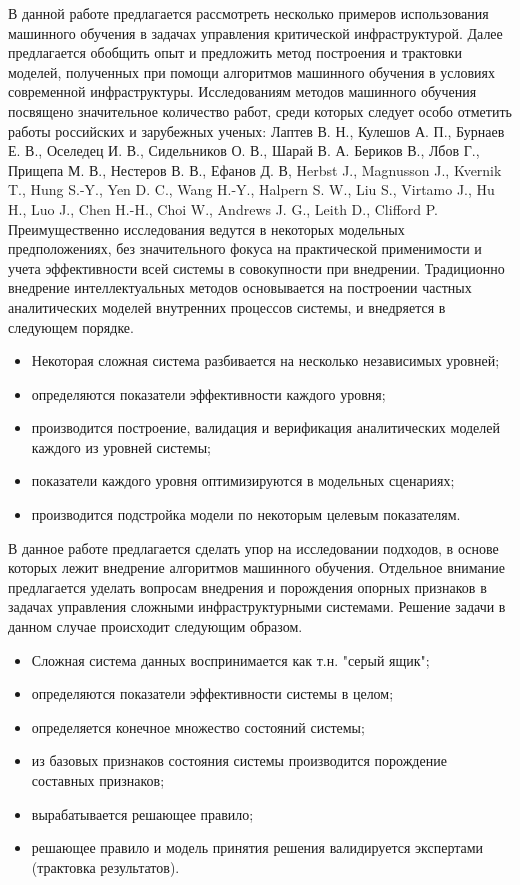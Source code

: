 
{\actuality}
В данной работе предлагается рассмотреть несколько примеров использования машинного обучения в задачах управления критической инфраструктурой. Далее предлагается обобщить опыт и предложить метод построения и трактовки моделей, полученных при помощи алгоритмов машинного обучения в условиях современной инфраструктуры.
Исследованиям методов машинного обучения посвящено значительное количество работ, среди которых следует особо отметить работы российских и зарубежных ученых: Лаптев В. Н., Кулешов А. П., Бурнаев Е. В., Оселедец И. В., Сидельников О. В., Шарай В. А. Бериков В., Лбов Г., Прищепа М. В., Нестеров В. В., Ефанов Д. В, Herbst J., Magnusson J., Kvernik T., Hung S.-Y., Yen D. C., Wang H.-Y., Halpern S. W., Liu S., Virtamo J., Hu H., Luo J., Chen H.-H., Choi W., Andrews J. G., Leith D., Clifford P. Преимущественно исследования ведутся в некоторых модельных предположениях, без значительного фокуса на практической применимости и учета эффективности всей системы в совокупности при внедрении.
Традиционно внедрение интеллектуальных методов основывается на построении частных аналитических моделей внутренних процессов системы, и внедряется в следующем порядке.
\begin{itemize}
\item  Некоторая сложная система разбивается на несколько независимых уровней;
\item  определяются показатели эффективности каждого уровня;
\item  производится построение, валидация и верификация аналитических моделей каждого из уровней системы;
\item  показатели каждого уровня оптимизируются в модельных сценариях;
\item  производится подстройка модели по некоторым целевым показателям.
\end{itemize}

В данное работе предлагается сделать упор на исследовании подходов, в основе которых лежит внедрение алгоритмов машинного обучения. Отдельное внимание предлагается уделать вопросам внедрения и порождения опорных признаков в задачах управления сложными инфраструктурными системами. Решение задачи в данном случае происходит следующим образом.
\begin{itemize}
\item  Сложная система данных воспринимается как т.н. "серый ящик";
\item  определяются показатели эффективности системы в целом;
\item  определяется конечное множество состояний системы;
\item  из базовых признаков состояния системы производится порождение составных признаков;
\item  вырабатывается решающее правило;
\item  решающее правило и модель принятия решения валидируется экспертами (трактовка результатов).
\end{itemize}

